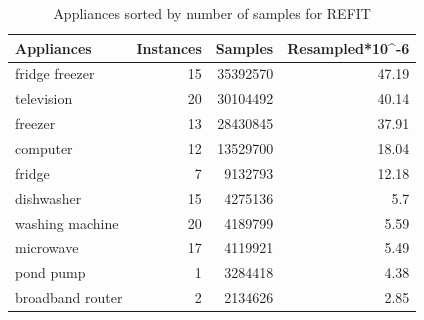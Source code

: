 \begin{table}[H]
    \centering
    \begin{tabular}{|l|r|r|r|}
    \hline
    \textbf{Appliances} & \multicolumn{1}{l|}{\textbf{Instances}} & \multicolumn{1}{l|}{\textbf{Samples}} & \multicolumn{1}{l|}{\textbf{Resampled*10\textasciicircum{}-6}} \\ \hline
    fridge freezer      & 15                                      & 35392570                              & 47.19                                                        \\ \hline
    television          & 20                                      & 30104492                              & 40.14                                                         \\ \hline
    freezer             & 13                                      & 28430845                              & 37.91                                                        \\ \hline
    computer            & 12                                      & 13529700                              & 18.04                                                        \\ \hline
    fridge              & 7                                       & 9132793                               & 12.18                                                        \\ \hline
    dishwasher          & 15                                      & 4275136                               & 5.7                                                         \\ \hline
    washing machine     & 20                                      & 4189799                               & 5.59                                                         \\ \hline
    microwave           & 17                                      & 4119921                               & 5.49                                                         \\ \hline
    pond pump           & 1                                       & 3284418                               & 4.38                                                         \\ \hline
    broadband router    & 2                                       & 2134626                               & 2.85                                                         \\ \hline
    \end{tabular}
    \caption{Appliances sorted by number of samples for REFIT}
    \label{tab:refit_table}
\end{table}

